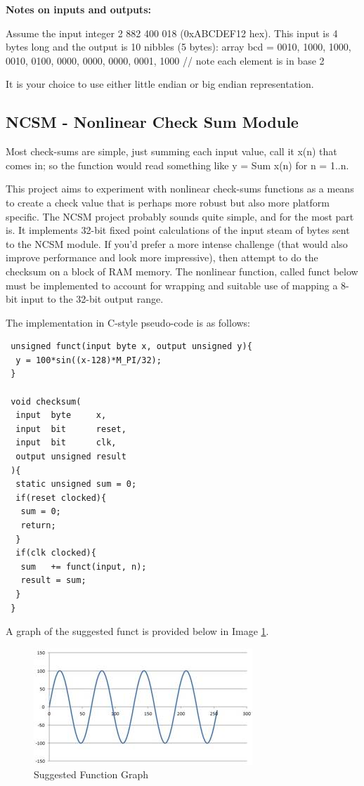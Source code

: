 \textbf{Notes on inputs and outputs:}

Assume the input integer 2 882 400 018 (0xABCDEF12 hex). This input is 4 bytes long and the output is 10 nibbles (5 bytes): array bcd = {0010, 1000, 1000, 0010, 0100, 0000, 0000, 0000, 0001, 1000} // note each element is in base 2

It is your choice to use either little endian or big endian representation.

\subsection{NCSM - Nonlinear Check Sum Module}
Most check-sums are simple, just summing each input value, call it x(n) that comes in; so the function would read something like y = Sum x(n) for n = 1..n.

This project aims to experiment with nonlinear check-sums functions as a means to create a check value that is perhaps more robust but also more platform specific. The NCSM project probably sounds quite simple, and for the most part is. It implements 32-bit fixed point calculations of the input steam of bytes sent to the NCSM module. If you'd prefer a more intense challenge (that would also improve performance and look more impressive), then attempt to do the checksum on a block of RAM memory. The nonlinear function, called funct below must be implemented to account for wrapping and suitable use of mapping a 8-bit input to the 32-bit output range.

The implementation in C-style pseudo-code is as follows:
\begin{lstlisting}
 unsigned funct(input byte x, output unsigned y){
  y = 100*sin((x-128)*M_PI/32);
 }
 
 void checksum(
  input  byte     x,
  input  bit      reset,
  input  bit      clk,
  output unsigned result
 ){
  static unsigned sum = 0;
  if(reset clocked){
   sum = 0;
   return;
  }
  if(clk clocked){
   sum   += funct(input, n);
   result = sum;
  }
 }
\end{lstlisting}
A graph of the suggested funct is provided below in Image \ref{fig:NCSM}.

\begin{figure}[H]
\centering
\includegraphics[width=0.6\columnwidth]{Figures/NCSM}
\caption{Suggested Function Graph}
\label{fig:NCSM}
\end{figure}

